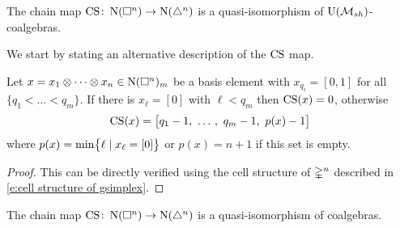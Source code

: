 \begin{theorem} \label{t:main local}
	The chain map $\CS \colon \chains(\cube^n) \to \chains(\simplex^n)$ is a quasi-isomorphism of $\UMsh$-coalgebras.
\end{theorem}

We start by stating an alternative description of the $\CS$ map.

\begin{lemma} \label{l:cs explicit}
	Let $x = x_1 \ot \cdots \ot x_n \in \chains(\cube^n)_m$ be a basis element with $x_{q_i} = [0,1]$ for all $\{q_1 < \dots < q_m\}$.
	If there is $x_\ell = [0]$ with $\ell < q_m$ then $\CS(x) = 0$, otherwise
	\[
	\CS(x) = \big[ q_1-1, \ \dots \, , \ q_m-1, \ p(x)-1 \big]
	\]
	where $p(x) = \min \set[\big]{\ell \mid x_\ell = [0]}$ or $p(x) = n+1$ if this set is empty.
\end{lemma}

\begin{proof}
	This can be directly verified using the cell structure of $\gsimplex^n$ described in \cref{e:cell structure of gsimplex}.
\end{proof}

\begin{lemma} \label{l:cs coalgebra map}
	The chain map $\CS \colon \chains(\cube^n) \to \chains(\simplex^n)$ is a quasi-isomorphism of coalgebras.
\end{lemma}

